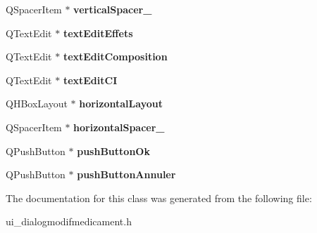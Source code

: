 \begin{DoxyCompactItemize}
\item 
\hypertarget{classUi__DialogModifMedicament_a1ce64e2c297e2ce758f026713614f4a5}{Q\-Spacer\-Item $\ast$ {\bfseries vertical\-Spacer\-\_}}\label{classUi__DialogModifMedicament_a1ce64e2c297e2ce758f026713614f4a5}

\item 
\hypertarget{classUi__DialogModifMedicament_a3c3653f365048fa8cdac98c4afffb174}{Q\-Text\-Edit $\ast$ {\bfseries text\-Edit\-Effets}}\label{classUi__DialogModifMedicament_a3c3653f365048fa8cdac98c4afffb174}

\item 
\hypertarget{classUi__DialogModifMedicament_a3ddc88ec877ecda31826d08a462f1f3a}{Q\-Text\-Edit $\ast$ {\bfseries text\-Edit\-Composition}}\label{classUi__DialogModifMedicament_a3ddc88ec877ecda31826d08a462f1f3a}

\item 
\hypertarget{classUi__DialogModifMedicament_aba758935ccf341a30656900db89c1597}{Q\-Text\-Edit $\ast$ {\bfseries text\-Edit\-C\-I}}\label{classUi__DialogModifMedicament_aba758935ccf341a30656900db89c1597}

\item 
\hypertarget{classUi__DialogModifMedicament_a30dc81e32e379ba3e5ea9a1137e9e4ae}{Q\-H\-Box\-Layout $\ast$ {\bfseries horizontal\-Layout}}\label{classUi__DialogModifMedicament_a30dc81e32e379ba3e5ea9a1137e9e4ae}

\item 
\hypertarget{classUi__DialogModifMedicament_a9385701a9c805b6bcbae4d26f3c663ec}{Q\-Spacer\-Item $\ast$ {\bfseries horizontal\-Spacer\-\_}}\label{classUi__DialogModifMedicament_a9385701a9c805b6bcbae4d26f3c663ec}

\item 
\hypertarget{classUi__DialogModifMedicament_a7a9af19a939de01d66dfea2dd63a7d5b}{Q\-Push\-Button $\ast$ {\bfseries push\-Button\-Ok}}\label{classUi__DialogModifMedicament_a7a9af19a939de01d66dfea2dd63a7d5b}

\item 
\hypertarget{classUi__DialogModifMedicament_a895915fe9da663063de16d09773a2efd}{Q\-Push\-Button $\ast$ {\bfseries push\-Button\-Annuler}}\label{classUi__DialogModifMedicament_a895915fe9da663063de16d09773a2efd}

\end{DoxyCompactItemize}


The documentation for this class was generated from the following file\-:\begin{DoxyCompactItemize}
\item 
ui\-\_\-dialogmodifmedicament.\-h\end{DoxyCompactItemize}
